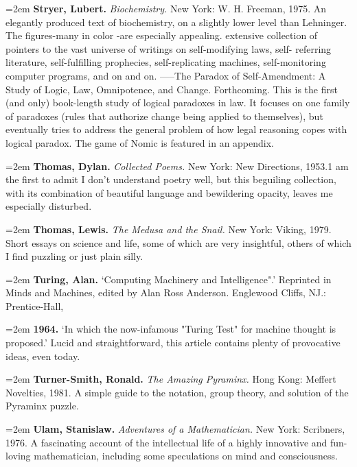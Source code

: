 \par\noindent\hangindent=2em {\bf Stryer, Lubert.} {\it Biochemistry.} New York: W. H. Freeman, 1975. An elegantly produced text of biochemistry, on a slightly lower level than Lehninger. The figures-many in color -are especially appealing. extensive collection of pointers to the vast universe of writings on self-modifying laws, self- referring literature, self-fulfilling prophecies, self-replicating machines, self-monitoring computer programs, and on and on. -----The Paradox of Self-Amendment: A Study of Logic, Law, Omnipotence, and Change. Forthcoming. This is the first (and only) book-length study of logical paradoxes in law. It focuses on one family of paradoxes (rules that authorize change being applied to themselves), but eventually tries to address the general problem of how legal reasoning copes with logical paradox. The game of Nomic is featured in an appendix.

\par\noindent\hangindent=2em {\bf Thomas, Dylan.} {\it Collected Poems.} New York: New Directions, 1953.1 am the first to admit I don't understand poetry well, but this beguiling collection, with its combination of beautiful language and bewildering opacity, leaves me especially disturbed.

\par\noindent\hangindent=2em {\bf Thomas, Lewis.} {\it The Medusa and the Snail.} New York: Viking, 1979. Short essays on science and life, some of which are very insightful, others of which I find puzzling or just plain silly.

\par\noindent\hangindent=2em {\bf Turing, Alan.} `Computing Machinery and Intelligence".' Reprinted in Minds and Machines, edited by Alan Ross Anderson. Englewood Cliffs, NJ.: Prentice-Hall,

\par\noindent\hangindent=2em {\bf 1964.} `In which the now-infamous "Turing Test" for machine thought is proposed.' Lucid and straightforward, this article contains plenty of provocative ideas, even today.

\par\noindent\hangindent=2em {\bf Turner-Smith, Ronald.} {\it The Amazing Pyraminx.} Hong Kong: Meffert Novelties, 1981. A simple guide to the notation, group theory, and solution of the Pyraminx puzzle.

\par\noindent\hangindent=2em {\bf Ulam, Stanislaw.} {\it Adventures of a Mathematician.} New York: Scribners, 1976. A fascinating account of the intellectual life of a highly innovative and fun-loving mathematician, including some speculations on mind and consciousness.

